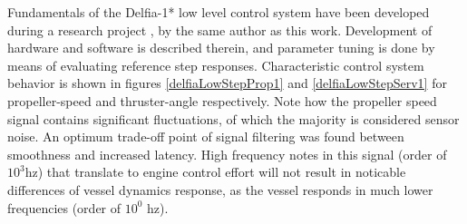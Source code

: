  \begin{figure}[h!]
	\centering
\end{figure}


Fundamentals of the Delfia-1* low level control system have been developed during a research project \citet{boogmans2020Delfia}, by the same author as this work. Development of hardware and software is described therein, and parameter tuning is done by means of evaluating reference step responses. Characteristic control system behavior is shown in figures \ref{delfiaLowStepProp1} and \ref{delfiaLowStepServ1} for propeller-speed and thruster-angle respectively. Note how the propeller speed signal contains significant fluctuations, of which the majority is considered sensor noise. An optimum trade-off point of signal filtering was found between smoothness and increased latency. High frequency notes in this signal (order of $10^3$hz) that translate to engine control effort will not result in noticable differences of vessel dynamics response, as the  vessel responds in much lower frequencies (order of $10^0$ hz). 

